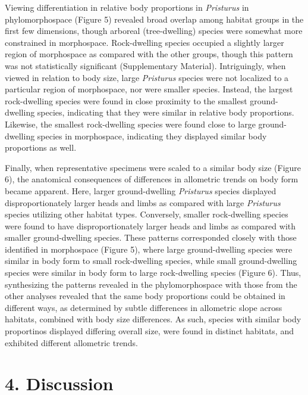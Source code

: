 \documentclass[
  11pt,
]{article}
\begin{document}
Viewing differentiation in relative body proportions in \emph{Pristurus}
in phylomorphospace (Figure 5) revealed broad overlap among habitat
groups in the first few dimensions, though arboreal (tree-dwelling)
species were somewhat more constrained in morphospace. Rock-dwelling
species occupied a slightly larger region of morphospace as compared
with the other groups, though this pattern was not statistically
significant (Supplementary Material). Intriguingly, when viewed in
relation to body size, large \emph{Pristurus} species were not localized
to a particular region of morphospace, nor were smaller species.
Instead, the largest rock-dwelling species were found in close proximity
to the smallest ground-dwelling species, indicating that they were
similar in relative body proportions. Likewise, the smallest
rock-dwelling species were found close to large ground-dwelling species
in morphospace, indicating they displayed similar body proportions as
well. \hfill\break

Finally, when representative specimens were scaled to a similar body
size (Figure 6), the anatomical consequences of differences in
allometric trends on body form became apparent. Here, larger
ground-dwelling \emph{Pristurus} species displayed disproportionately
larger heads and limbs as compared with large \emph{Pristurus} species
utilizing other habitat types. Conversely, smaller rock-dwelling species
were found to have disproportionately larger heads and limbs as compared
with smaller ground-dwelling species. These patterns corresponded
closely with those identified in morphospace (Figure 5), where large
ground-dwelling species were similar in body form to small rock-dwelling
species, while small ground-dwelling species were similar in body form
to large rock-dwelling species (Figure 6). Thus, synthesizing the
patterns revealed in the phylomorphospace with those from the other
analyses revealed that the same body proportions could be obtained in
different ways, as determined by subtle differences in allometric slope
across habitats, combined with body size differences. As such, species
with similar body proportinos displayed differing overall size, were
found in distinct habitats, and exhibited different allometric trends.
\hfill\break

\hypertarget{discussion}{%
\section{4. Discussion}\label{discussion}}
\end{document}
